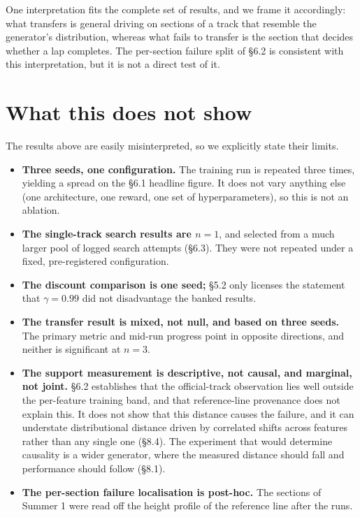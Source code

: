 \documentclass[11pt]{article}
\begin{document}
One interpretation fits the complete set of results, and we frame it accordingly: what transfers is general driving on sections of a track that resemble the generator's distribution, whereas what fails to transfer is the section that decides whether a lap completes. The per-section failure split of \S6.2 is consistent with this interpretation, but it is not a direct test of it.

\section{What this does not show}

The results above are easily misinterpreted, so we explicitly state their limits.

\begin{itemize}[leftmargin=*]
\item \textbf{Three seeds, one configuration.} The training run is repeated three times, yielding a spread on the \S6.1 headline figure. It does not vary anything else (one architecture, one reward, one set of hyperparameters), so this is not an ablation.
\item \textbf{The single-track search results are $n=1$}, and selected from a much larger pool of logged search attempts (\S6.3). They were not repeated under a fixed, pre-registered configuration.
\item \textbf{The discount comparison is one seed;} \S5.2 only licenses the statement that $\gamma = 0.99$ did not disadvantage the banked results.
\item \textbf{The transfer result is mixed, not null, and based on three seeds.} The primary metric and mid-run progress point in opposite directions, and neither is significant at $n=3$.
\item \textbf{The support measurement is descriptive, not causal, and marginal, not joint.} \S6.2 establishes that the official-track observation lies well outside the per-feature training band, and that reference-line provenance does not explain this. It does not show that this distance causes the failure, and it can understate distributional distance driven by correlated shifts across features rather than any single one (\S8.4). The experiment that would determine causality is a wider generator, where the measured distance should fall and performance should follow (\S8.1).
\item \textbf{The per-section failure localisation is post-hoc.} The sections of Summer 1 were read off the height profile of the reference line after the runs.

\end{itemize}
\end{document}
